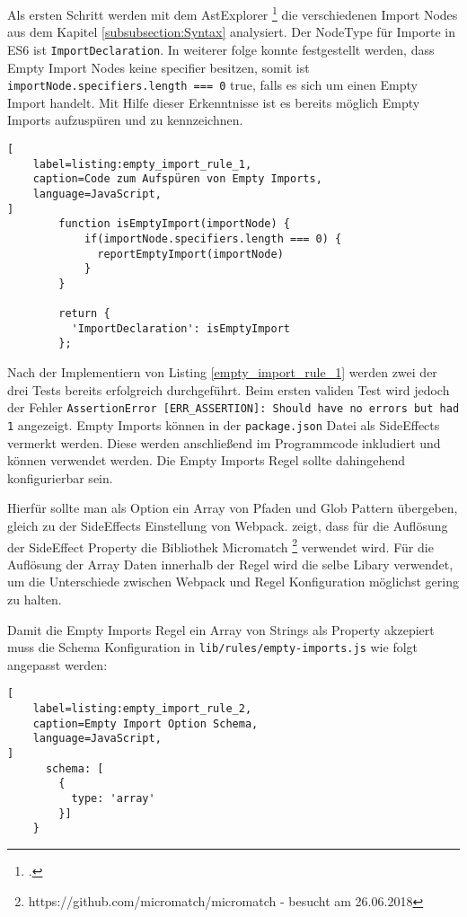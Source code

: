 Als ersten Schritt werden mit dem AstExplorer \footcite{https://astexplorer.net/ - besucht am 26.06.2018} die 
verschiedenen Import Nodes aus dem Kapitel \ref{subsubsection:Syntax} analysiert. Der NodeType für Importe in ES6 ist \lstinline{ImportDeclaration}. In weiterer folge konnte festgestellt werden, dass Empty Import Nodes keine specifier besitzen, somit ist \lstinline{importNode.specifiers.length === 0} true, falls es sich um einen Empty Import handelt. Mit Hilfe dieser Erkenntnisse ist es bereits möglich Empty Imports aufzuspüren und zu kennzeichnen.

\begin{lstlisting}[
    label=listing:empty_import_rule_1,
	caption=Code zum Aufspüren von Empty Imports,
	language=JavaScript,
]
        function isEmptyImport(importNode) {
            if(importNode.specifiers.length === 0) {
              reportEmptyImport(importNode)
            }
        }

        return {
          'ImportDeclaration': isEmptyImport
        };
\end{lstlisting}

Nach der Implementiern von Listing \ref{empty_import_rule_1} werden zwei der drei Tests bereits erfolgreich durchgeführt.  Beim ersten validen Test wird jedoch der Fehler \lstinline{AssertionError [ERR_ASSERTION]: Should have no errors but had 1} angezeigt. Empty Imports können in der \lstinline{package.json} Datei als SideEffects vermerkt werden. Diese werden anschließend im Programmcode inkludiert und können verwendet werden. Die Empty Imports Regel sollte dahingehend konfigurierbar sein.

Hierfür sollte man als Option ein Array von Pfaden und Glob Pattern übergeben, gleich zu der SideEffects Einstellung von Webpack. \textcite{WebpackTreeShaking} zeigt, dass für die Auflösung der SideEffect Property die Bibliothek Micromatch \footnote{https://github.com/micromatch/micromatch - besucht am 26.06.2018} verwendet wird. Für die Auflösung der Array Daten innerhalb der Regel wird die selbe Libary verwendet, um die Unterschiede zwischen Webpack und Regel Konfiguration möglichst gering zu halten.

Damit die Empty Imports Regel ein Array von Strings als Property akzepiert muss die Schema Konfiguration in \lstinline{lib/rules/empty-imports.js} wie folgt angepasst werden:

\begin{lstlisting}[
    label=listing:empty_import_rule_2,
	caption=Empty Import Option Schema,
	language=JavaScript,
]
      schema: [
        {
          type: 'array'
        }]
    }
\end{lstlisting}

